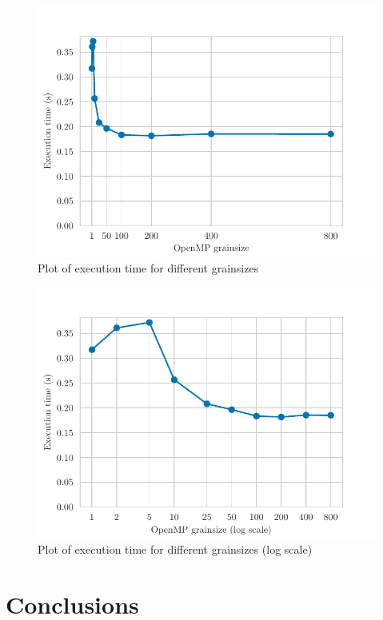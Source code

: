 \begin{figure}[H]
    \centering
    \includegraphics{plots/grainsize.pdf}
    \caption{Plot of execution time for different grainsizes}
    \label{fig:grain} 
\end{figure}

\begin{figure}[H]
    \centering
    \includegraphics{plots/grainsize_log.pdf}
    \caption{Plot of execution time for different grainsizes (log scale)}
    \label{fig:grain_log} 
\end{figure}

\section{Conclusions}%
\label{sec:Conclusions}





